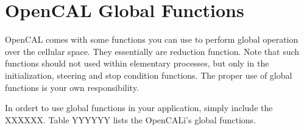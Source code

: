 \section{OpenCAL Global Functions}

OpenCAL comes with some functions you can use to perform global
operation over the cellular space. They essentially are reduction
function. Note that such functions should not used within elementary
processes, but only in the initialization, steering and stop condition
functions. The proper use of global functions is your own
responsibility.

In ordert to use global functions in your application, simply include
the XXXXXX. Table YYYYYY lists the OpenCALì's global functions.
